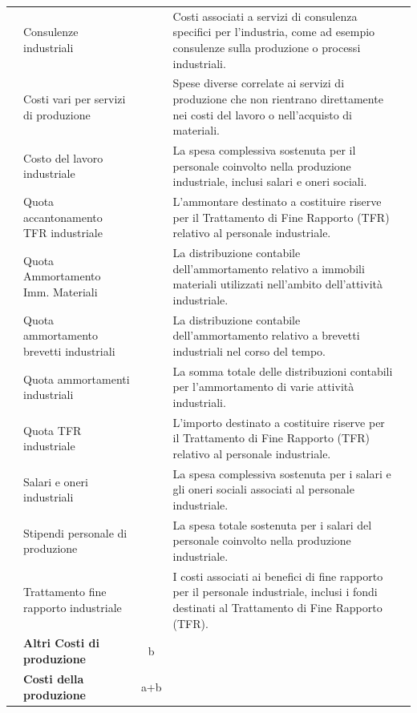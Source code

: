 \documentclass{article}
\newcommand{\ConsulenzeIndustriali}{Costi associati a servizi di consulenza specifici per l'industria, come ad esempio consulenze sulla produzione o processi industriali.}
\newcommand{\CostiVariServiziProduzione}{Spese diverse correlate ai servizi di produzione che non rientrano direttamente nei costi del lavoro o nell'acquisto di materiali.}
\newcommand{\CostoLavoroIndustriale}{La spesa complessiva sostenuta per il personale coinvolto nella produzione industriale, inclusi salari e oneri sociali.}
\newcommand{\QuotaAccantonamentoTFRIndustriale}{L'ammontare destinato a costituire riserve per il Trattamento di Fine Rapporto (TFR) relativo al personale industriale.}
\newcommand{\QuotaAmmortamentoImmobiliMateriali}{La distribuzione contabile dell'ammortamento relativo a immobili materiali utilizzati nell'ambito dell'attività industriale.}
\newcommand{\QuotaAmmortamentoBrevettiIndustriali}{La distribuzione contabile dell'ammortamento relativo a brevetti industriali nel corso del tempo.}
\newcommand{\QuotaAmmortamentiIndustriali}{La somma totale delle distribuzioni contabili per l'ammortamento di varie attività industriali.}
\newcommand{\QuotaTFRIndustriale}{L'importo destinato a costituire riserve per il Trattamento di Fine Rapporto (TFR) relativo al personale industriale.}
\newcommand{\SalariOneriIndustriali}{La spesa complessiva sostenuta per i salari e gli oneri sociali associati al personale industriale.}
\newcommand{\StipendiPersonaleProduzione}{La spesa totale sostenuta per i salari del personale coinvolto nella produzione industriale.}
\newcommand{\TrattamentoFineRapportoIndustriale}{I costi associati ai benefici di fine rapporto per il personale industriale, inclusi i fondi destinati al Trattamento di Fine Rapporto (TFR).}
\begin{document}
\begin{table}[ht]
{\begin{tabular}{|c l|c|l|c|}
                           & Consulenze industriali                                                  &                    & \ConsulenzeIndustriali                                      &           \\
                           & Costi vari per servizi di produzione                                    &                    & \CostiVariServiziProduzione                                 &           \\
                           & Costo del lavoro industriale                                            &                    & \CostoLavoroIndustriale                                     &           \\
                           & Quota accantonamento TFR industriale                                    &                    & \QuotaAccantonamentoTFRIndustriale                          &           \\
                           & Quota Ammortamento Imm. Materiali                                       &                    & \QuotaAmmortamentoImmobiliMateriali                         &           \\
                           & Quota ammortamento brevetti industriali                                 &                    & \QuotaAmmortamentoBrevettiIndustriali                       &           \\
                           & Quota ammortamenti industriali                                          &                    & \QuotaAmmortamentiIndustriali                               &           \\
                           & Quota TFR industriale                                                   &                    & \QuotaTFRIndustriale                                        &           \\
                           & Salari e oneri industriali                                              &                    & \SalariOneriIndustriali                                     &           \\
                           & Stipendi personale di produzione                                        &                    & \StipendiPersonaleProduzione                                &           \\
                           & Trattamento fine rapporto industriale                                   &                    & \TrattamentoFineRapportoIndustriale                         &           \\
                           & \textbf{Altri Costi di produzione}                                      & b                  &                                                             &           \\
                           & \textbf{Costi della produzione}                                         & a+b                &                                                             &           \\



\end{tabular}}
\end{table}
\end{document}
